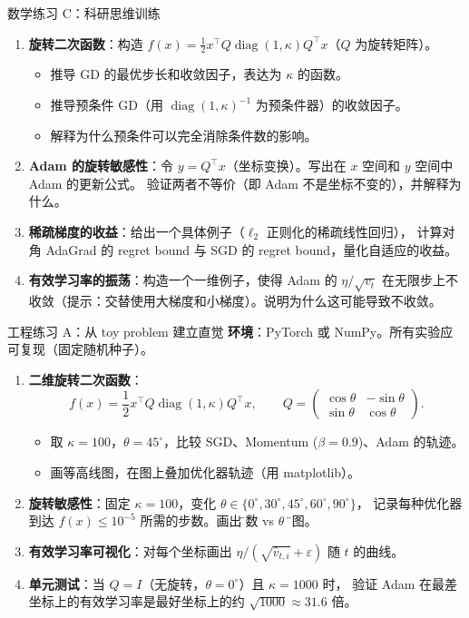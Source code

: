 \documentclass[aspectratio=169,10pt]{ctexbeamer}
\newcommand{\diag}{\operatorname{diag}}
\newcommand{\eps}{\varepsilon}
\begin{document}
\begin{frame}{数学练习 C：科研思维训练}
\begin{enumerate}
  \item \textbf{旋转二次函数}：构造 $f(x)=\frac12 x^\top Q\diag(1,\kappa)Q^\top x$（$Q$ 为旋转矩阵）。
  \begin{itemize}
    \item 推导 GD 的最优步长和收敛因子，表达为 $\kappa$ 的函数。
    \item 推导预条件 GD（用 $\diag(1,\kappa)^{-1}$ 为预条件器）的收敛因子。
    \item 解释为什么预条件可以完全消除条件数的影响。
  \end{itemize}
  \item \textbf{Adam 的旋转敏感性}：令 $y=Q^\top x$（坐标变换）。写出在 $x$ 空间和 $y$ 空间中 Adam 的更新公式。
  验证两者不等价（即 Adam 不是坐标不变的），并解释为什么。
  \item \textbf{稀疏梯度的收益}：给出一个具体例子（$\ell_2$ 正则化的稀疏线性回归），
  计算对角 AdaGrad 的 regret bound 与 SGD 的 regret bound，量化自适应的收益。
  \item \textbf{有效学习率的振荡}：构造一个一维例子，使得 Adam 的 $\eta/\sqrt{v_t}$ 在无限步上不收敛（提示：交替使用大梯度和小梯度）。说明为什么这可能导致不收敛。
\end{enumerate}
\end{frame}

\begin{frame}{工程练习 A：从 toy problem 建立直觉}
\textbf{环境}：PyTorch 或 NumPy。所有实验应可复现（固定随机种子）。

\begin{enumerate}
  \item \textbf{二维旋转二次函数}：
  \[
    f(x)=\frac12 x^\top Q\diag(1,\kappa)Q^\top x,\qquad
    Q=\begin{pmatrix}\cos\theta & -\sin\theta\\\sin\theta & \cos\theta\end{pmatrix}.
  \]
  \begin{itemize}
    \item 取 $\kappa=100$，$\theta=45^\circ$，比较 SGD、Momentum ($\beta=0.9$)、Adam 的轨迹。
    \item 画等高线图，在图上叠加优化器轨迹（用 matplotlib）。
  \end{itemize}
  \item \textbf{旋转敏感性}：固定 $\kappa=100$，变化 $\theta\in\{0^\circ,30^\circ,45^\circ,60^\circ,90^\circ\}$，
  记录每种优化器到达 $f(x)\le10^{-5}$ 所需的步数。画出\"步数 vs $\theta$ \"的图。
  \item \textbf{有效学习率可视化}：对每个坐标画出 $\eta/(\sqrt{\hat v_{t,i}}+\eps)$ 随 $t$ 的曲线。
  \item \textbf{单元测试}：当 $Q=I$（无旋转，$\theta=0^\circ$）且 $\kappa=1000$ 时，
  验证 Adam 在最差坐标上的有效学习率是最好坐标上的约 $\sqrt{1000}\approx31.6$ 倍。
\end{enumerate}
\end{frame}
\end{document}
